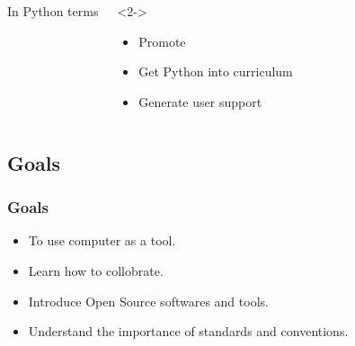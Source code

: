 \documentclass[compress,red]{beamer} %
\begin{document}
\begin{frame}
\begin{columns}
\begin{exampleblock}{}
In Python terms
\end{exampleblock}
\begin{exampleblock}<2->{}
\begin{itemize}
\item Promote 
\item Get Python into curriculum
\item Generate user support
\end{itemize}
\end{exampleblock}
\end{columns}
\end{frame}

\subsection{Goals}
\begin{frame}
\frametitle{Goals}
\begin{itemize}
\item To use computer as a tool.
\item Learn how to collobrate.
\item Introduce Open Source softwares and tools.
\item Understand the importance of standards and conventions.
\end{itemize}
\end{frame}
\end{document}
